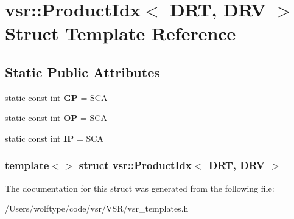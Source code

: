 \hypertarget{structvsr_1_1_product_idx_3_01_d_r_t_00_01_d_r_v_01_4}{\section{vsr\-:\-:Product\-Idx$<$ D\-R\-T, D\-R\-V $>$ Struct Template Reference}
\label{structvsr_1_1_product_idx_3_01_d_r_t_00_01_d_r_v_01_4}
}
\subsection*{Static Public Attributes}
\begin{DoxyCompactItemize}
\item 
\hypertarget{structvsr_1_1_product_idx_3_01_d_r_t_00_01_d_r_v_01_4_adbd63f56f0ab8dac48850e811185777d}{static const int {\bfseries G\-P} = S\-C\-A}\label{structvsr_1_1_product_idx_3_01_d_r_t_00_01_d_r_v_01_4_adbd63f56f0ab8dac48850e811185777d}

\item 
\hypertarget{structvsr_1_1_product_idx_3_01_d_r_t_00_01_d_r_v_01_4_a6f39f5c5742d96129410e02ef24e326d}{static const int {\bfseries O\-P} = S\-C\-A}\label{structvsr_1_1_product_idx_3_01_d_r_t_00_01_d_r_v_01_4_a6f39f5c5742d96129410e02ef24e326d}

\item 
\hypertarget{structvsr_1_1_product_idx_3_01_d_r_t_00_01_d_r_v_01_4_af22e8a39434edd4ee3839b5c991166a3}{static const int {\bfseries I\-P} = S\-C\-A}\label{structvsr_1_1_product_idx_3_01_d_r_t_00_01_d_r_v_01_4_af22e8a39434edd4ee3839b5c991166a3}

\end{DoxyCompactItemize}
\subsubsection*{template$<$$>$ struct vsr\-::\-Product\-Idx$<$ D\-R\-T, D\-R\-V $>$}



The documentation for this struct was generated from the following file\-:\begin{DoxyCompactItemize}
\item 
/\-Users/wolftype/code/vsr/\-V\-S\-R/vsr\-\_\-templates.\-h\end{DoxyCompactItemize}
